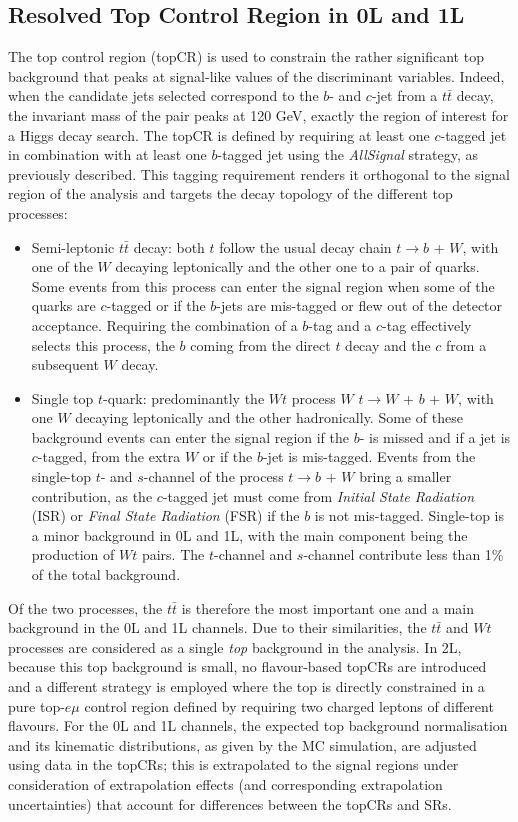 \subsection{Resolved Top Control Region in 0L and 1L}
The top control region (topCR) is used to constrain the rather significant top background that peaks at signal-like values of the discriminant variables. Indeed, when the candidate jets selected correspond to the $b$- and $c$-jet from a $t\bar{t}$ decay, the invariant mass of the pair peaks at 120 GeV, exactly the region of interest for a Higgs decay search. The topCR is defined by requiring at least one $c$-tagged jet in combination with at least one $b$-tagged jet using the \textit{AllSignal} strategy, as previously described. This tagging requirement renders it orthogonal to the signal region of the analysis and targets the decay topology of the different top processes: 
\begin{itemize}
\item Semi-leptonic $t\bar{t}$ decay: both $t$ follow the usual decay chain  $t \rightarrow b$ + $W$, with one of the $W$ decaying leptonically and the other one to a pair of quarks. Some events from this process can enter the signal region when some of the quarks are $c$-tagged or if the $b$-jets are mis-tagged or flew out of the detector acceptance. Requiring the combination of a $b$-tag and a $c$-tag effectively selects this process, the $b$ coming from the direct $t$ decay and the $c$ from a subsequent $W$ decay. 
\item Single top $t$-quark: predominantly the $Wt$ process $W$ $t \rightarrow W$ +  $b$ + $W$, with one $W$ decaying leptonically and the other hadronically. Some of these background events can enter the signal region if the $b$- is missed and if a jet is $c$-tagged, from the extra $W$ or if the $b$-jet is mis-tagged. Events from the single-top $t$- and $s$-channel of the process $t \rightarrow b$ + $W$ bring a smaller contribution, as the $c$-tagged jet must come from \textit{Initial State Radiation} (ISR) or \textit{Final State Radiation} (FSR) if the $b$ is not mis-tagged. Single-top is a minor background in 0L and 1L, with the main component being the production of $Wt$ pairs. The $t$-channel and $s$-channel contribute less than 1\% of the total background.
\end{itemize}

Of the two processes, the $t\bar{t}$ is therefore the most important one and a main background in the 0L and 1L channels. Due to their similarities, the $t\bar{t}$ and $Wt$ processes are considered as a single \textit{top} background in the analysis. In 2L, because this top background is small, no flavour-based topCRs are introduced and a different strategy is employed where the top is directly constrained in a pure top-$e\mu$ control region defined by requiring two charged leptons of different flavours. For the 0L and 1L channels, the expected top background normalisation and its kinematic distributions, as given by the MC simulation, are adjusted using data in the topCRs; this is extrapolated to the signal regions under consideration of extrapolation effects (and corresponding extrapolation uncertainties) that account for differences between the topCRs and SRs. \\

